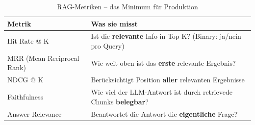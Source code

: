\begin{table}[H]
\centering
\begin{tabularx}{\linewidth}{lX}
\toprule
\textbf{Metrik} & \textbf{Was sie misst} \\
\midrule
Hit Rate @ K & Ist die \textbf{relevante} Info in Top-K? (Binary: ja/nein pro Query) \\
MRR (Mean Reciprocal Rank) & Wie weit oben ist das \textbf{erste} relevante Ergebnis? \\
NDCG @ K & Berücksichtigt Position \textbf{aller} relevanten Ergebnisse \\
Faithfulness & Wie viel der LLM-Antwort ist durch retrievede Chunks \textbf{belegbar}? \\
Answer Relevance & Beantwortet die Antwort die \textbf{eigentliche} Frage? \\
\midrule
\end{tabularx}
\caption{RAG-Metriken -- das Minimum für Produktion}
\label{tab:rag-metrics}
\end{table}


